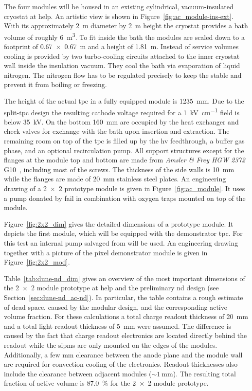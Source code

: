 The four modules will be housed in an existing cylindrical, vacuum-insulated cryostat at \gls{help}.
An artistic view is shown in Figure~\ref{fig:ac_module-ins-ext}.
With its approximately \SI{2}{\metre} diameter by \SI{2}{\metre} height the cryostat provides a \lar{} bath volume of roughly \SI{6}{\metre\cubed}.
To fit inside the bath the modules are scaled down to a footprint of \SI{0.67 x 0.67}{\metre} and a height of \SI{1.81}{\metre}.
Instead of service volumes cooling is provided by two turbo-cooling circuits attached to the inner cryostat wall inside the insulation vacuum.
They cool the \lar{} bath via evaporation of liquid nitrogen.
The nitrogen flow has to be regulated precisely to keep the \lar{} stable and prevent it from boiling or freezing.

The height of the actual \gls{tpc} in a fully equipped module is \SI{1235}{\milli\metre}.
Due to the split-\gls{tpc} design the resulting cathode voltage required for a \SI{1}{\kilo\volt\per\centi\metre} field is below \SI{35}{\kilo\volt}.
On the bottom \SI{160}{\milli\metre} are occupied by the heat exchanger and check valves for \lar{} exchange with the bath upon insertion and extraction.
The remaining room on top of the \gls{tpc} is filled up by the \gls{hv} feedthrough, a buffer gas phase, and an optional recirculation pump.
All support structures except for the flanges at the module top and bottom are made from \emph{Amsler \& Frey HGW 2372} G10~\cite{g10}, including most of the screws.
The thickness of the side walls is \SI{10}{\milli\metre} while the flanges are made of \SI{20}{\milli\metre} stainless steel plates.
An engineering drawing of a \num{2 x 2} prototype module is given in Figure~\ref{fig:ac_module}.
It uses a \lar{} pump donated by \gls{fail} in combination with oxygen traps mounted on top of the module.

Figure~\ref{fig:2x2_dim} gives the detailed dimensions of a prototype module.
It depicts the first module, which will be equipped with the demonstrator \gls{tpc}.
For this test an internal pump salvaged from \AT{} will be used.
An engineering drawing together with a picture of the pixel demonstrator module is given in Figure~\ref{fig:2x2_mod}.

Table~\ref{tab:dune-nd_dim} gives an overview of the most important dimensions of the \num{2 x 2} module prototype at \gls{help} and the preliminary \dune{} \gls{nd} design (see Section~\ref{sec:dune-nd_ac-nd}).
In particular, the table contains a rough estimate of dead space, caused by the modular design, and the corresponding active volume fraction.
For these calculations a total charge readout thickness of \SI{20}{\milli\metre} and a total light readout thickness of \SI{5}{\milli\metre} were assumed.
The difference is caused by the fact that charge readout electronics are located directly behind the readout while the \glspl{sipm} are only mounted on the edges of the \AL{} modules.
Additionally, a few \si{\milli\metre} clearance between the anode plane and the module wall are required for convection cooling of the \larpix{} electronics.
Readout thicknesses also include the clearance between adjacent modules ($\sim{\SI{1}{\milli\metre}}$).
The resulting total fraction of active volume is \SI{87.0}{\percent} for the \num{2 x 2} module prototype.

